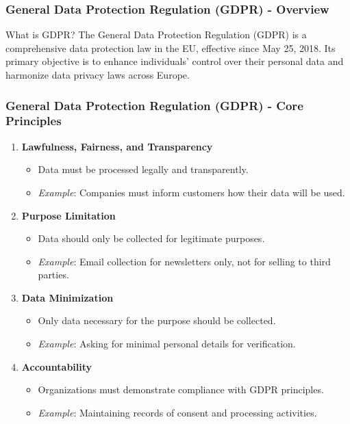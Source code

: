 \documentclass{beamer}
\begin{document}
\begin{frame}[fragile]
    \frametitle{General Data Protection Regulation (GDPR) - Overview}
    \begin{block}{What is GDPR?}
        The General Data Protection Regulation (GDPR) is a comprehensive data protection law in the EU, effective since May 25, 2018. 
        Its primary objective is to enhance individuals' control over their personal data and harmonize data privacy laws across Europe.
    \end{block}
\end{frame}

\begin{frame}[fragile]
    \frametitle{General Data Protection Regulation (GDPR) - Core Principles}
    \begin{enumerate}
        \item \textbf{Lawfulness, Fairness, and Transparency}
            \begin{itemize}
                \item Data must be processed legally and transparently.
                \item \textit{Example}: Companies must inform customers how their data will be used.
            \end{itemize}
        
        \item \textbf{Purpose Limitation}
            \begin{itemize}
                \item Data should only be collected for legitimate purposes.
                \item \textit{Example}: Email collection for newsletters only, not for selling to third parties.
            \end{itemize}

        \item \textbf{Data Minimization}
            \begin{itemize}
                \item Only data necessary for the purpose should be collected.
                \item \textit{Example}: Asking for minimal personal details for verification.
            \end{itemize}
        
        \item \textbf{Accountability}
            \begin{itemize}
                \item Organizations must demonstrate compliance with GDPR principles.
                \item \textit{Example}: Maintaining records of consent and processing activities.
            \end{itemize}
    \end{enumerate}
\end{frame}
\end{document}
